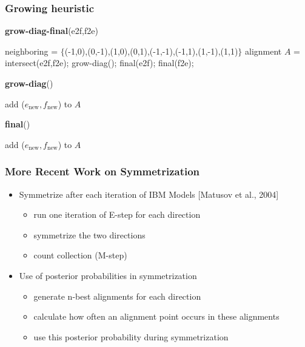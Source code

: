  
\begin{frame}[fragile]
\frametitle{Growing heuristic\koehnref}

{\footnotesize {\bf grow-diag-final}(e2f,f2e)
\begin{algorithmic}[1]
\STATE neighboring = $\{$(-1,0),(0,-1),(1,0),(0,1),(-1,-1),(-1,1),(1,-1),(1,1)$\}$
\STATE alignment $A$ = intersect(e2f,f2e); grow-diag(); final(e2f); final(f2e);
\end{algorithmic}
{\bf grow-diag}()
\begin{algorithmic}[1]
           \STATE add ($e_\text{new},f_\text{new}$) to $A$
        \ENDIF
       \ENDFOR  
  \ENDFOR  
\ENDWHILE
\end{algorithmic}
{\bf final}()
\begin{algorithmic}[1]
       \STATE add ($e_\text{new},f_\text{new}$) to $A$
     \ENDIF
\ENDFOR  
\end{algorithmic}
}

\end{frame}

 
\begin{frame}
\frametitle{More Recent Work on Symmetrization\koehnref}

\begin{itemize}
\item Symmetrize after each iteration of IBM Models [Matusov et al., 2004]
\begin{itemize}
\item run one iteration of E-step for each direction
\item symmetrize the two directions
\item count collection (M-step)
\end{itemize}
\vspace{5mm}
\item Use of posterior probabilities in symmetrization 
\begin{itemize}
\item generate n-best alignments for each direction
\item calculate how often an alignment point occurs in these alignments
\item use this posterior probability during symmetrization
\end{itemize}
\end{itemize}

\end{frame}

